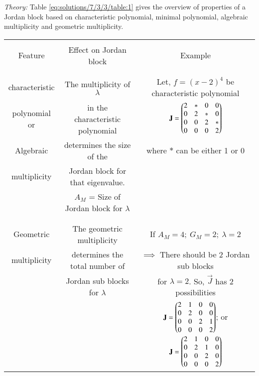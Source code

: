 %
{\em Theory: }
Table \ref{eq:solutions/7/3/3/table:1} gives the overview of properties of a Jordan block based on characteristic polynomial, minimal polynomial, algebraic multiplicity and geometric multiplicity.
\begin{table*}[!ht]
\begin{center}
\begin{tabular}{|c|c|c|}
\hline
& &\\
Feature & Effect on Jordan block & Example\\
& &\\
\hline

& &\\
characteristic & The multiplicity of $\lambda$ & Let, $f = (x-2)^4$ be characteristic polynomial\\
polynomial or & in the characteristic polynomial & $\mathbf{J} = \begin{pmatrix}2 & * & 0 & 0 \\ 0 & 2 & * & 0 \\ 0 & 0 & 2 & * \\ 0 & 0 & 0 & 2\end{pmatrix}$\\
Algebraic & determines the size of the & where $*$ can be either 1 or 0\\
multiplicity & Jordan block for that eigenvalue.&\\
& $A_M$ = Size of Jordan block for $\lambda$& \\
& &\\
\hline

& & \\
Geometric & The geometric multiplicity & If $A_M = 4; \: G_M = 2; \: \lambda = 2$\\
multiplicity & determines the total number of & $\implies$ There should be 2 Jordan sub blocks\\ 
& Jordan sub blocks for $\lambda$ & for $\lambda = 2$. So, $\vec{J}$ has 2 possibilities\\
& & $\mathbf{J} = \begin{pmatrix}2 & 1 & 0 & 0 \\ 0 & 2 & 0 & 0 \\ 0 & 0 & 2 & 1 \\ 0 & 0 & 0 & 2\end{pmatrix}$;\: or $\mathbf{J} = \begin{pmatrix}2 & 1 & 0 & 0 \\ 0 & 2 & 1 & 0 \\ 0 & 0 & 2 & 0 \\ 0 & 0 & 0 & 2\end{pmatrix}$\\
\hline


\end{tabular}
\end{center}
\end{table*}
